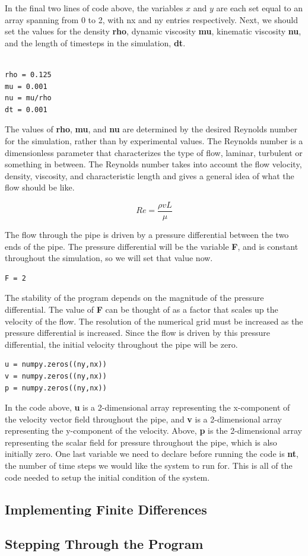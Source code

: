 \documentclass[twocolumn,12pth]{article}
\begin{document}
In the final two lines of code above, the variables $x$ and $y$ are each set equal to an array spanning from 0 to 2, with nx and ny entries respectively. Next, we should set the values for the density \textbf{rho}, dynamic viscosity \textbf{mu}, kinematic viscosity \textbf{nu}, and the length of timesteps in the simulation, \textbf{dt}.

\begin{lstlisting}

rho = 0.125
mu = 0.001
nu = mu/rho
dt = 0.001

\end{lstlisting}

The values of \textbf{rho}, \textbf{mu}, and \textbf{nu} are determined by the desired Reynolds number for the simulation, rather than by experimental values.
The Reynolds number is a dimensionless parameter that characterizes the type of flow, laminar, turbulent or something in between.
The Reynolds number takes into account the flow velocity, density, viscosity, and characteristic length and gives a general idea of what the flow should be like.

\begin{equation}
Re = \frac{\rho{v}{L}}{\mu}
\end{equation}

The flow through the pipe is driven by a pressure differential between the two ends of the pipe.
The pressure differential will be the variable \textbf{F}, and is constant throughout the simulation, so we will set that value now.

\begin{lstlisting}
F = 2
\end{lstlisting}

The stability of the program depends on the magnitude of the pressure differential.
The value of \textbf{F} can be thought of as a factor that scales up the velocity of the flow.
The resolution of the numerical grid must be increased as the pressure differential is increased.
Since the flow is driven by this pressure differential, the initial velocity throughout the pipe will be zero.

\begin{lstlisting}
u = numpy.zeros((ny,nx))
v = numpy.zeros((ny,nx))
p = numpy.zeros((ny,nx))
\end{lstlisting}

In the code above, \textbf{u} is a 2-dimensional array representing the x-component of the velocity vector field throughout the pipe, and \textbf{v} is a 2-dimensional array representing the y-component of the velocity.
Above, \textbf{p} is the 2-dimensional array representing the scalar field for pressure throughout the pipe, which is also initially zero.
One last variable we need to declare before running the code is \textbf{nt}, the number of time steps we would like the system to run for.
This is all of the code needed to setup the initial condition of the system.

\subsection{Implementing Finite Differences}

\subsection{Stepping Through the Program}


\nocite{*}

\end{document}

